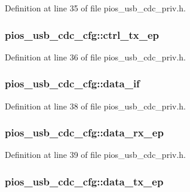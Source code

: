 Definition at line 35 of file pios\-\_\-usb\-\_\-cdc\-\_\-priv.\-h.

\hypertarget{structpios__usb__cdc__cfg_a66e87c604aa767dc74141a0b7e7e3b7f}{
\subsubsection[{ctrl\-\_\-tx\-\_\-ep}]{ pios\-\_\-usb\-\_\-cdc\-\_\-cfg\-::ctrl\-\_\-tx\-\_\-ep}}\label{structpios__usb__cdc__cfg_a66e87c604aa767dc74141a0b7e7e3b7f}


Definition at line 36 of file pios\-\_\-usb\-\_\-cdc\-\_\-priv.\-h.

\hypertarget{structpios__usb__cdc__cfg_a6812747b57d5aa880ba1c3bde8f6333c}{
\subsubsection[{data\-\_\-if}]{ pios\-\_\-usb\-\_\-cdc\-\_\-cfg\-::data\-\_\-if}}\label{structpios__usb__cdc__cfg_a6812747b57d5aa880ba1c3bde8f6333c}


Definition at line 38 of file pios\-\_\-usb\-\_\-cdc\-\_\-priv.\-h.

\hypertarget{structpios__usb__cdc__cfg_a93c34c9365c4f3593572f3c75039dc3c}{
\subsubsection[{data\-\_\-rx\-\_\-ep}]{ pios\-\_\-usb\-\_\-cdc\-\_\-cfg\-::data\-\_\-rx\-\_\-ep}}\label{structpios__usb__cdc__cfg_a93c34c9365c4f3593572f3c75039dc3c}


Definition at line 39 of file pios\-\_\-usb\-\_\-cdc\-\_\-priv.\-h.

\hypertarget{structpios__usb__cdc__cfg_a00440e0eaec6a2c120fd8909599e8f61}{
\subsubsection[{data\-\_\-tx\-\_\-ep}]{ pios\-\_\-usb\-\_\-cdc\-\_\-cfg\-::data\-\_\-tx\-\_\-ep}}\label{structpios__usb__cdc__cfg_a00440e0eaec6a2c120fd8909599e8f61}



